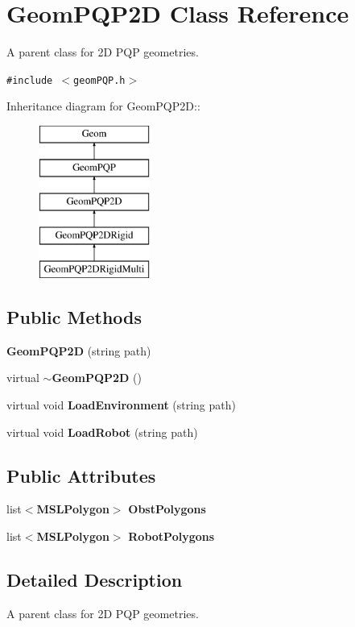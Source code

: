 \section{Geom\-PQP2D  Class Reference}
\label{class_GeomPQP2D}
A parent class for 2D PQP geometries. 


{\tt \#include $<$geom\-PQP.h$>$}

Inheritance diagram for Geom\-PQP2D::\begin{figure}[H]
\begin{center}
\leavevmode
\includegraphics[height=5cm]{class_GeomPQP2D}
\end{center}
\end{figure}
\subsection*{Public Methods}
\begin{CompactItemize}
\item 
{\bf Geom\-PQP2D} (string path)
\item 
virtual {\bf $\sim$Geom\-PQP2D} ()
\item 
virtual void {\bf Load\-Environment} (string path)
\item 
virtual void {\bf Load\-Robot} (string path)
\end{CompactItemize}
\subsection*{Public Attributes}
\begin{CompactItemize}
\item 
list$<${\bf MSLPolygon}$>$ {\bf Obst\-Polygons}
\item 
list$<${\bf MSLPolygon}$>$ {\bf Robot\-Polygons}
\end{CompactItemize}


\subsection{Detailed Description}
A parent class for 2D PQP geometries.



